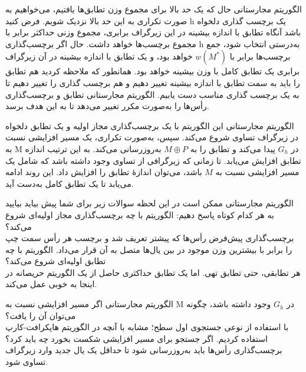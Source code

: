 \begin{itemframe}{الگوریتم مجارستانی}
\itm
حال که یک حد بالا برای مجموع وزن تطابق‌ها یافتیم، می‌خواهیم به صورت تکراری به این حد بالا نزدیک شویم.
\itm
فرض کنید h یک برچسب گذاری دلخواه باشد آنگاه تطابق با اندازه بیشینه
در این زیرگراف برابری، مجموع وزنی حداکثر برابر با مجموع برچسب‌ها خواهد داشت.
\itm
حال اگر برچسب‌گذاری h به‌درستی انتخاب شود، جمع برچسب‌ها برابر با $w(M^\ast)$ خواهد بود، و یک تطابق با اندازه بیشینه در آن زیرگراف برابری یک تطابق کامل با وزن بیشینه خواهد بود.
\itm
همانطور که ملاحظه کردید هم تطابق را باید به سمت تطابق با اندازه بیشینه تغییر دهیم و هم برچسب گذاری را تغییر دهیم تا به یک برچسب گذاری مناسب دست یابیم.
الگوریتم مجارستانی تطابق و برچسب‌گذاری رأس‌ها را به‌صورت مکرر تغییر می‌دهد تا به این هدف برسد.
\end{itemframe}


\begin{itemframe}{الگوریتم مجارستانی}
\itm
این الگوریتم با یک برچسب‌گذاری مجاز اولیه و یک تطابق دلخواه در زیرگراف تساوی شروع می‌کند. سپس، به‌صورت تکراری، یک مسیر افزایشی نسبت به  M در $G_h$ پیدا می‌کند و تطابق را به $M \oplus P$ به‌روزرسانی می‌کند. به این ترتیب اندازه تطابق افزایش می‌یابد.
\itm
تا زمانی که زیرگرافی از تساوی وجود داشته باشد که شامل یک مسیر افزایشی نسبت به $M$ باشد، می‌توان اندازهٔ تطابق را افزایش داد. این روند ادامه می‌یابد تا یک تطابق کامل به‌دست آید.
\end{itemframe}


\begin{itemframe}{الگوریتم مجارستانی}
\itm
ممکن است در این لحظه سوالات زیر برای شما پیش بیاید بیایید به هر کدام کوتاه پاسخ دهیم:
\itm
الگوریتم با چه برچسب‌گذاری مجاز اولیه‌ای شروع می‌کند؟\\
برچسب‌گذاری پیش‌فرض رأس‌ها که پیشتر تعریف شد و برچسب هر رأس سمت چپ را برابر با بیشترین وزن موجود در بین یال‌ها متصل به آن قرار می‌داد.
\itm
الگوریتم با چه تطابق اولیه‌ای شروع می‌کند؟\\
هر تطابقی، حتی تطابق تهی. اما یک تطابق حداکثری حاصل از یک الگوریتم حریصانه در اینجا به خوبی عمل می‌کند.
\end{itemframe}


\begin{itemframe}{الگوریتم مجارستانی}
\itm
اگر مسیر افزایشی نسبت به M در $G_h$ وجود داشته باشد، چگونه می‌توان آن را یافت؟\\
با استفاده از نوعی جستجوی اول سطح؛ مشابه با آنچه در الگوریتم هاپکرافت-کارپ استفاده کردیم.
\itm
اگر جستجو برای مسیر افزایشی شکست بخورد چه باید کرد؟\\
برچسب‌گذاری رأس‌ها باید به‌روزرسانی شود تا حداقل یک یال جدید وارد زیرگراف تساوی شود.
\end{itemframe}


